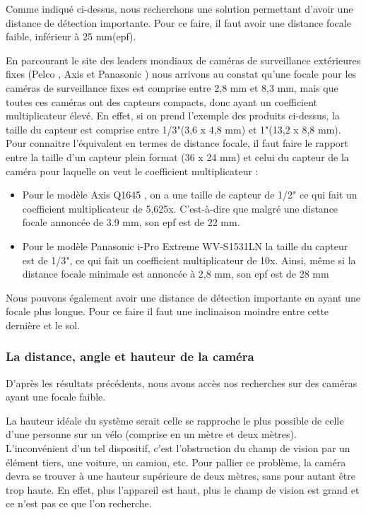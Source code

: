Comme indiqué ci-dessus, nous recherchons une solution permettant d'avoir une distance de détection importante.
Pour ce faire, il faut avoir une distance focale faible, inférieur à 25 mm(\gls{epf}).

En parcourant le site des leaders mondiaux de caméras de surveillance extérieures fixes
(Pelco \cite{pelco}, Axis \cite{axis} et Panasonic \cite{panasonic})
nous arrivons au constat qu'une focale pour les caméras de surveillance fixes est comprise entre 2,8 mm et 8,3 mm, mais que toutes ces caméras ont des capteurs compacts, donc ayant un coefficient multiplicateur élevé.
En effet, si on prend l'exemple des produits ci-dessus, la taille du capteur est comprise entre 1/3"(3,6 x 4,8 mm) et 1"(13,2 x 8,8 mm).
Pour connaitre l'équivalent en termes de distance focale, il faut faire le rapport entre la taille d'un capteur plein format (36 x 24 mm)
et celui du capteur de la caméra pour laquelle on veut le coefficient multiplicateur :
\begin{itemize}
    \item Pour le modèle Axis Q1645 \cite{axisQ1645}, on a une taille de capteur de 1/2"
          ce qui fait un coefficient multiplicateur de 5,625x. C'est-à-dire que malgré une distance focale annoncée de 3.9 mm, son \gls{epf} est de 22 mm.
    \item Pour le modèle Panasonic i-Pro Extreme WV-S1531LN \cite{panaIPro}
          la taille du capteur est de 1/3", ce qui fait un coefficient multiplicateur de 10x. Ainsi, même si la distance focale minimale est annoncée à 2,8 mm, son \gls{epf} est de 28 mm
\end{itemize}

Nous pouvons également avoir une distance de détection importante en ayant une focale plus longue. Pour ce faire il faut une inclinaison moindre entre cette dernière et le sol.


\subsubsection{La distance, angle et hauteur de la caméra}
\label{sec:camera_distance}
D'après les résultats précédents, nous avons accès nos recherches sur des caméras ayant une focale faible.

La hauteur idéale du système serait celle se rapproche le plus possible de celle d'une personne sur un vélo (comprise en un mètre et deux mètres).
L'inconvénient d'un tel dispositif, c'est l'obstruction du champ de vision par un élément tiers, une voiture, un camion, etc. Pour pallier ce problème,
la caméra devra se trouver à une hauteur supérieure de deux mètres, sans pour autant être trop haute. En effet, plus l'appareil est haut,
plus le champ de vision est grand et ce n'est pas ce que l'on recherche.

